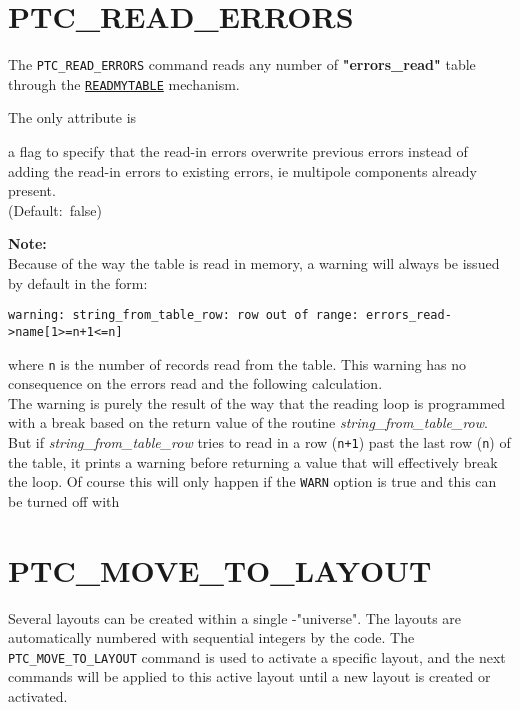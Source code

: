 \section{PTC\_READ\_ERRORS}
\label{sec:ptc_read_errors}

The {\tt PTC\_READ\_ERRORS} command reads any number of
\textbf{"errors\_read"} table through the 
\hyperref[sec:readmytable]{\tt READMYTABLE} mechanism.


The only attribute is 
\begin{madlist}
    a flag to specify that the read-in errors
   overwrite previous errors instead of adding the read-in errors to
   existing errors, ie multipole components already present.\\
   (Default:~false)  
\end{madlist}

{\bf Note:}\\
Because of the way the table is read in memory, a warning will always be
issued by default in the form:
\begin{verbatim}
warning: string_from_table_row: row out of range: errors_read->name[1>=n+1<=n]
\end{verbatim}
where {\tt n} is  the number of records read from the table. 
This warning has no consequence on the errors read and the following
calculation. \\
The warning is purely the result of the way that the reading loop is
programmed with a break based on the return value of the routine
{\sl string\_from\_table\_row}.  
But if {\sl string\_from\_table\_row} tries to read in a row ({\tt n+1})
past the last row ({\tt n}) of the table, it prints a warning before
returning a value that will effectively break the loop. Of course this
will only happen if the {\tt WARN} option is true and this can be turned
off with 

       
\section{PTC\_MOVE\_TO\_LAYOUT}
\label{sec:ptc_move_to_layout}

Several \ptc layouts can be created within a single \ptc-"universe". 
The layouts are automatically numbered with sequential integers by the 
\madx code. The {\tt PTC\_MOVE\_TO\_LAYOUT} command is used to
activate a specific layout, and the next \ptc commands will be
applied to this active \ptc layout until a new \ptc layout is created
or activated. 


